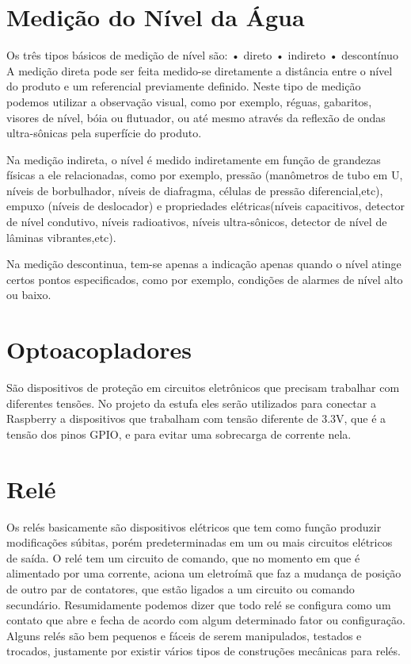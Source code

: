\section{Medição do Nível da Água}

Os três tipos básicos de medição de nível são:
• direto
• indireto
• descontínuo
A medição direta pode ser feita medido-se diretamente a distância entre o nível do produto e um referencial previamente definido. Neste tipo de medição podemos utilizar a observação visual, como por exemplo, réguas, gabaritos, visores de nível, bóia ou flutuador, ou até mesmo através da reflexão de ondas ultra-sônicas pela superfície do produto\cite{cassiolato2010}.

Na medição indireta, o nível é medido indiretamente em função de grandezas físicas a ele relacionadas, como por exemplo, pressão (manômetros de tubo em U, níveis de borbulhador, níveis de diafragma, células de pressão diferencial,etc), empuxo (níveis de deslocador) e propriedades elétricas(níveis capacitivos, detector de nível condutivo, níveis radioativos, níveis ultra-sônicos, detector de nível de lâminas vibrantes,etc)\cite{cassiolato2010}.

Na medição descontinua, tem-se apenas a indicação apenas quando o nível atinge certos pontos especificados, como por exemplo, condições de alarmes de nível alto ou baixo\cite{cassiolato2010}.

\section{Optoacopladores}

São dispositivos de proteção em circuitos eletrônicos que precisam trabalhar com diferentes tensões. No projeto da estufa eles serão utilizados para conectar a Raspberry a dispositivos que trabalham com tensão diferente de 3.3V, que é a tensão dos pinos GPIO, e para evitar uma sobrecarga de corrente nela. \cite{vishay}

\section{Relé}

Os relés basicamente são dispositivos elétricos que tem como função produzir modificações súbitas, porém predeterminadas em um ou mais circuitos elétricos de saída. O relé tem um circuito de comando, que no momento em que é alimentado por uma corrente, aciona um eletroímã que faz a mudança de posição de outro par de contatores, que estão ligados a um circuito ou comando secundário. Resumidamente podemos dizer que todo relé se configura como um contato que abre e fecha de acordo com algum determinado fator ou configuração. Alguns relés são bem pequenos e fáceis de serem manipulados, testados e trocados, justamente por existir vários tipos de construções mecânicas para relés\cite{braga2012}.

